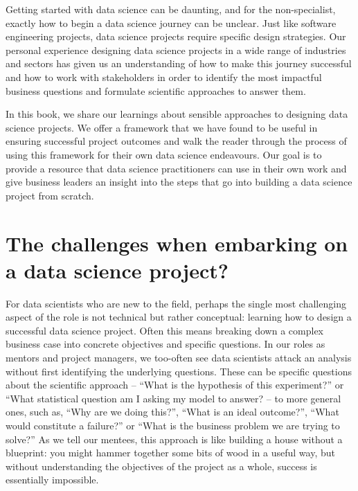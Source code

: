 \documentclass[
]{book}
\begin{document}
Getting started with data science can be daunting, and for the non-specialist, exactly how to begin a data science journey can be unclear. Just like software engineering projects, data science projects require specific design strategies. Our personal experience designing data science projects in a wide range of industries and sectors has given us an understanding of how to make this journey successful and how to work with stakeholders in order to identify the most impactful business questions and formulate scientific approaches to answer them.

In this book, we share our learnings about sensible approaches to designing data science projects. We offer a framework that we have found to be useful in ensuring successful project outcomes and walk the reader through the process of using this framework for their own data science endeavours. Our goal is to provide a resource that data science practitioners can use in their own work and give business leaders an insight into the steps that go into building a data science project from scratch.

\hypertarget{the-challenges-when-embarking-on-a-data-science-project}{%
\section{The challenges when embarking on a data science project?}\label{the-challenges-when-embarking-on-a-data-science-project}}

For data scientists who are new to the field, perhaps the single most challenging aspect of the role is not technical but rather conceptual: learning how to design a successful data science project. Often this means breaking down a complex business case into concrete objectives and specific questions. In our roles as mentors and project managers, we too-often see data scientists attack an analysis without first identifying the underlying questions. These can be specific questions about the scientific approach -- ``What is the hypothesis of this experiment?'' or ``What statistical question am I asking my model to answer? -- to more general ones, such as, ``Why are we doing this?'', ``What is an ideal outcome?'', ``What would constitute a failure?'' or ``What is the business problem we are trying to solve?'' As we tell our mentees, this approach is like building a house without a blueprint: you might hammer together some bits of wood in a useful way, but without understanding the objectives of the project as a whole, success is essentially impossible.
\end{document}
